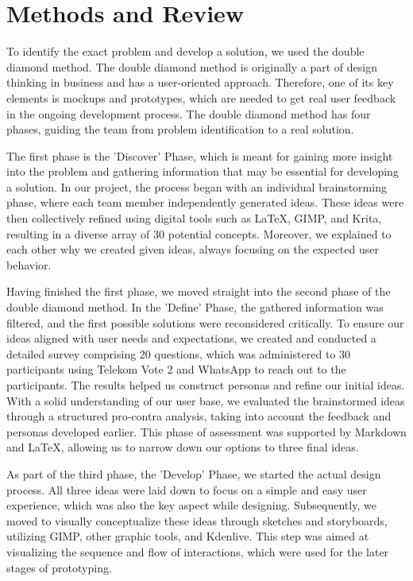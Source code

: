\documentclass{article}
\begin{document}
\section{Methods and Review}
To identify the exact problem and develop a solution, we used the double diamond method.
The double diamond method is originally a part of design thinking in business and has a user-oriented approach.
Therefore, one of its key elements is mockups and prototypes,
which are needed to get real user feedback in the ongoing development process.
The double diamond method has four phases, guiding the team from problem identification to a real solution.

The first phase is the 'Discover' Phase,
which is meant for gaining more insight into the problem and gathering information that may be essential for developing a solution.
In our project, the process began with an individual brainstorming phase, where each team member independently generated ideas.
These ideas were then collectively refined using digital tools such as
LaTeX, GIMP, and Krita, resulting in a diverse array of 30 potential concepts.
Moreover, we explained to each other why we created given ideas, always focusing on the expected user behavior.

Having finished the first phase, we moved straight into the second phase of the double diamond method.
In the 'Define' Phase, the gathered information was filtered, and the first possible solutions were reconsidered critically.
To ensure our ideas aligned with user needs and expectations, we created and conducted a detailed survey comprising 20 questions,
which was administered to 30 participants using Telekom Vote 2 and WhatsApp to reach out to the participants.
The results helped us construct personas and refine our initial ideas.
With a solid understanding of our user base, we evaluated the brainstormed ideas through a structured pro-contra analysis,
taking into account the feedback and personas developed earlier.
This phase of assessment was supported by Markdown and LaTeX, allowing us to narrow down our options to three final ideas.

As part of the third phase, the 'Develop' Phase, we started the actual design process.
All three ideas were laid down to focus on a simple and easy user experience, which was also the key aspect while designing.
Subsequently, we moved to visually conceptualize these ideas through sketches and storyboards,
utilizing GIMP, other graphic tools, and Kdenlive.
This step was aimed at visualizing the sequence and flow of interactions, which were used for the later stages of prototyping.
\end{document}
